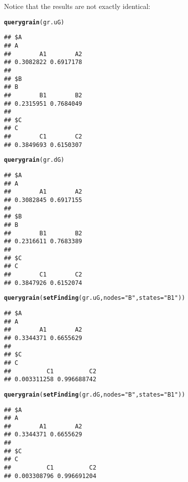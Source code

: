 \documentclass[10pt]{article}\usepackage[]{graphicx}\usepackage[]{color}
\makeatletter
\newcommand{\hlstr}[1]{\textcolor[rgb]{0.192,0.494,0.8}{#1}}%
\newcommand{\hlstd}[1]{\textcolor[rgb]{0.345,0.345,0.345}{#1}}%
\newcommand{\hlkwc}[1]{\textcolor[rgb]{0.333,0.667,0.333}{#1}}%
\newcommand{\hlkwd}[1]{\textcolor[rgb]{0.737,0.353,0.396}{\textbf{#1}}}%
\newenvironment{kframe}{%
 \def\at@end@of@kframe{}%
 \ifinner\ifhmode%
  \def\at@end@of@kframe{\end{minipage}}%
  \begin{minipage}{\columnwidth}%
 \fi\fi%
 \def\FrameCommand##1{\hskip\@totalleftmargin \hskip-\fboxsep
 \colorbox{shadecolor}{##1}\hskip-\fboxsep
     \hskip-\linewidth \hskip-\@totalleftmargin \hskip\columnwidth}%
 \MakeFramed {\advance\hsize-\width
   \@totalleftmargin\z@ \linewidth\hsize
   \@setminipage}}%
 {\par\unskip\endMakeFramed%
 \at@end@of@kframe}
\newenvironment{knitrout}{}{} %
\makeatother
\begin{document}
Notice that the results are not exactly identical:

\begin{knitrout}
\color{fgcolor}\begin{kframe}
\begin{alltt}
\hlkwd{querygrain}\hlstd{(gr.uG)}
\end{alltt}
\begin{verbatim}
## $A
## A
##        A1        A2 
## 0.3082822 0.6917178 
## 
## $B
## B
##        B1        B2 
## 0.2315951 0.7684049 
## 
## $C
## C
##        C1        C2 
## 0.3849693 0.6150307
\end{verbatim}
\begin{alltt}
\hlkwd{querygrain}\hlstd{(gr.dG)}
\end{alltt}
\begin{verbatim}
## $A
## A
##        A1        A2 
## 0.3082845 0.6917155 
## 
## $B
## B
##        B1        B2 
## 0.2316611 0.7683389 
## 
## $C
## C
##        C1        C2 
## 0.3847926 0.6152074
\end{verbatim}
\end{kframe}
\end{knitrout}


\begin{knitrout}
\color{fgcolor}\begin{kframe}
\begin{alltt}
\hlkwd{querygrain}\hlstd{(}\hlkwd{setFinding}\hlstd{(gr.uG,} \hlkwc{nodes}\hlstd{=}\hlstr{"B"}\hlstd{,} \hlkwc{states}\hlstd{=}\hlstr{"B1"}\hlstd{))}
\end{alltt}
\begin{verbatim}
## $A
## A
##        A1        A2 
## 0.3344371 0.6655629 
## 
## $C
## C
##          C1          C2 
## 0.003311258 0.996688742
\end{verbatim}
\begin{alltt}
\hlkwd{querygrain}\hlstd{(}\hlkwd{setFinding}\hlstd{(gr.dG,} \hlkwc{nodes}\hlstd{=}\hlstr{"B"}\hlstd{,} \hlkwc{states}\hlstd{=}\hlstr{"B1"}\hlstd{))}
\end{alltt}
\begin{verbatim}
## $A
## A
##        A1        A2 
## 0.3344371 0.6655629 
## 
## $C
## C
##          C1          C2 
## 0.003308796 0.996691204
\end{verbatim}
\end{kframe}
\end{knitrout}



\end{document}
